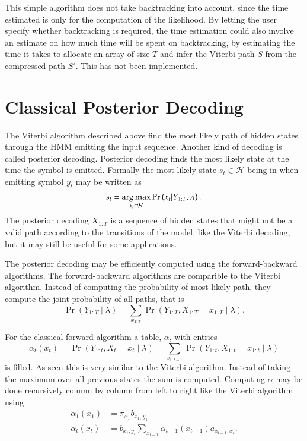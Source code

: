 This simple algorithm does not take backtracking into account, since the time
estimated is only for the computation of the likelihood. By letting the user
specify whether backtracking is required, the time estimation could also
involve an estimate on how much time will be spent on backtracking, by
estimating the time it takes to allocate an array of size $T$ and
infer the Viterbi path $S$ from the compressed path $S'$. This has
not been implemented.

\section{Classical Posterior Decoding}
\label{sec:posterior-decoding-1}

The Viterbi algorithm described above find the most likely path of hidden
states through the HMM emitting the input sequence. Another kind of decoding is
called posterior decoding. Posterior decoding finds the most likely state at
the time the symbol is emitted. Formally the most likely state
$s_t \in \mathcal{H}$ being in when emitting symbol $y_t$ may be written as
\begin{equation*}
  s_t = \operatorname*{arg\,max}_{x_t \in \mathcal{H}} \Pr \left(x_t | Y_{1:T}, \lambda \right).
\end{equation*}
The posterior decoding $X_{1:T}$ is a sequence of hidden states that might not
be a valid path according to the transitions of the model, like the Viterbi
decoding, but it may still be useful for some applications.

The posterior decoding may be efficiently computed using the forward-backward
algorithms. The forward-backward algorithms are comparible to the Viterbi
algorithm. Instead of computing the probability of most likely path, they
compute the joint probability of all paths, that is
\begin{equation*}
  \Pr
  \left(
    Y_{1:T} \mid \lambda
  \right) = \sum_{x_{1:T}} \Pr
  \left(
    Y_{1:T}, X_{1:T} = x_{1:T} \mid \lambda
  \right).
\end{equation*}

For the classical forward algorithm a table, $\alpha$, with entries
\begin{equation*}
\alpha_t(x_t) = \Pr \left( Y_{1:t}, X_t = x_t \mid \lambda \right) =
\sum_{x_{1:t-1}} \Pr \left( Y_{1:t}, X_{1:t} = x_{1:t} \mid \lambda \right)
\end{equation*}
is filled. As seen this is very similar to the Viterbi algorithm. Instead of
taking the maximum over all previous states the sum is computed. Computing
$\alpha$ may be done recursively column by column from left to right like the
Viterbi algorithm using
\begin{equation}
  \label{eq:8}
  \begin{aligned}
    \alpha_1(x_1) &= \pi_{x_1} b_{x_1, y_1} \\
    \alpha_t(x_t) &= b_{x_t, y_t} \sum_{x_{t - 1}} \alpha_{t - 1}(x_{t - 1})
    a_{x_{t - 1}, x_t}.
  \end{aligned}
\end{equation}

